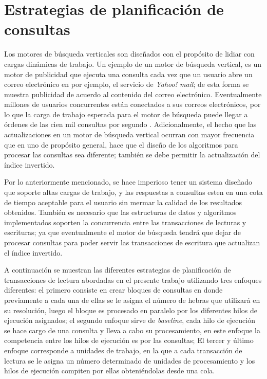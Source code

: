 \chapter{Estrategias de planificación de consultas}
\label{cap:planificacion}
Los motores de búsqueda verticales son diseñados con el propósito de lidiar con cargas dinámicas de trabajo. Un ejemplo de un motor de búsqueda vertical, es un motor de publicidad que ejecuta una consulta cada vez que un usuario abre un correo electrónico en por ejemplo, el servicio de \textit{Yahoo! mail}; de esta forma se muestra publicidad de acuerdo al contenido del correo electrónico. Eventualmente millones de usuarios concurrentes están conectados a sus correos electrónicos, por lo que la carga de trabajo esperada para el motor de búsqueda puede llegar a órdenes de las cien mil consultas por segundo \citep{Gil-Costa:2013}. Adicionalmente, el hecho que las actualizaciones en un motor de búsqueda vertical ocurran con mayor frecuencia que en uno de propósito general, hace que el diseño de los algoritmos para procesar las consultas sea diferente; también se debe permitir la actualización del índice invertido.

Por lo anteriormente mencionado, se hace imperioso tener un sistema diseñado que soporte altas cargas de trabajo, y las respuestas a consultas esten en una cota de tiempo aceptable para el usuario sin mermar la calidad de los resultados obtenidos. También es necesario que las estructuras de datos y algoritmos implementados soporten la concurrencia entre las transacciones de lecturas y escrituras; ya que eventualmente el motor de búsqueda tendrá que dejar de procesar consultas para poder servir las transacciones de escritura que actualizan el índice invertido.

A continuación se muestran las diferentes estrategias de planificación de transacciones de lectura abordadas en el presente trabajo utilizando tres enfoques diferentes: el primero consiste en crear bloques de consultas en donde previamente a cada una de ellas se le asigna el número de hebras que utilizará en su resolución, luego el bloque es procesado en paralelo por los diferentes hilos de ejecución asignados; el segundo enfoque sirve de \textit{baseline}, cada hilo de ejecución se hace cargo de una consulta y lleva a cabo su procesamiento, en este enfoque la competencia entre los hilos de ejecución es por las consultas; El tercer y último enfoque corresponde a unidades de trabajo, en la que a cada transacción de lectura se le asigna un número determinado de unidades de procesamiento y los hilos de ejecución compiten por ellas obteniéndolas desde una cola.


